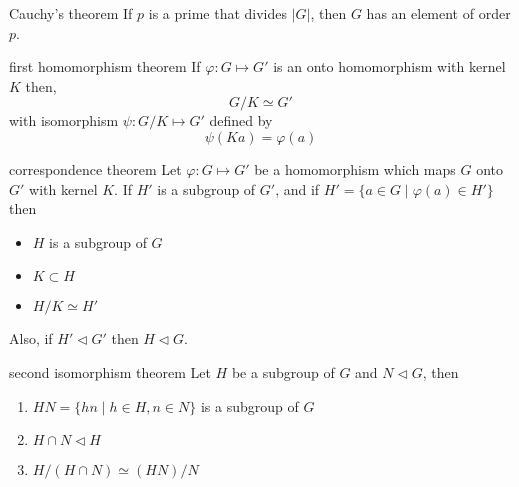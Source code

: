 \documentclass[avery5371,grid]{flashcards}
\begin{document}
\begin{flashcard}[Theorem]{Cauchy's theorem}
If $p$ is a prime that divides $\left| G \right|$,
then $G$ has an element of order $p$.
\end{flashcard}

\begin{flashcard}[Theorem]{first homomorphism theorem}
If $\varphi : G \mapsto G'$ is an onto homomorphism with kernel $K$ then,
\begin{equation*}
G/K \simeq G'
\end{equation*}
with isomorphism $\psi : G/K \mapsto G'$ defined by
\begin{equation*}
\psi (Ka) = \varphi(a)
\end{equation*}
\end{flashcard}

\begin{flashcard}[Theorem]{correspondence theorem}
Let $\varphi : G \mapsto G'$ be a homomorphism which maps $G$
onto $G'$ with kernel $K$.  If $H'$ is a subgroup of $G'$, and if
$H' = \lbrace a \in G \mid \varphi (a) \in H' \rbrace$ then
\begin{itemize}
\item $H$ is a subgroup of $G$
\item $K \subset H$
\item $H/K \simeq H'$
\end{itemize}
Also, if $H' \lhd G'$ then $H \lhd G$.
\end{flashcard}

\begin{flashcard}[Theorem]{second isomorphism theorem}
Let $H$ be a subgroup of $G$ and $N \lhd G$, then
\begin{enumerate}
\item $HN = \lbrace hn \mid h\in H, n\in N \rbrace$ is a subgroup of $G$
\item $H\cap N \lhd H$
\item $H/(H\cap N) \simeq (HN)/N$
\end{enumerate}
\end{flashcard}
\end{document}
